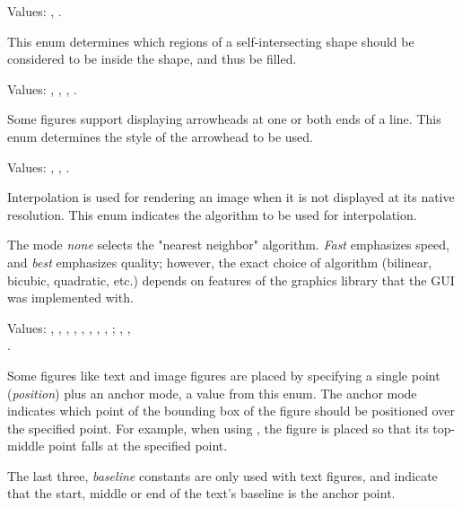 Values: , .

This enum determines which regions of a self-intersecting shape
should be considered to be inside the shape, and thus be filled.

\begin{center}
\end{center}


Values: , , , .

Some figures support displaying arrowheads at one or both ends of a line.
This enum determines the style of the arrowhead to be used.

\begin{center}
\end{center}


Values: , , .

Interpolation is used for rendering an image when it is not displayed at
its native resolution. This enum indicates the algorithm to be used for
interpolation.

The mode \textit{none} selects the "nearest neighbor" algorithm.
\textit{Fast} emphasizes speed, and \textit{best} emphasizes quality;
however, the exact choice of algorithm (bilinear, bicubic, quadratic, etc.)
depends on features of the graphics library that the GUI was implemented with.


Values:
, , , , ,
, , , ;
, , \\ .

Some figures like text and image figures are placed by specifying a single
point (\textit{position}) plus an anchor mode, a value from this enum. The
anchor mode indicates which point of the bounding box of the figure should
be positioned over the specified point. For example, when using
, the figure is placed so that its top-middle point falls at
the specified point.

The last three, \textit{baseline} constants are only used with text
figures, and indicate that the start, middle or end of the text's baseline
is the anchor point.


